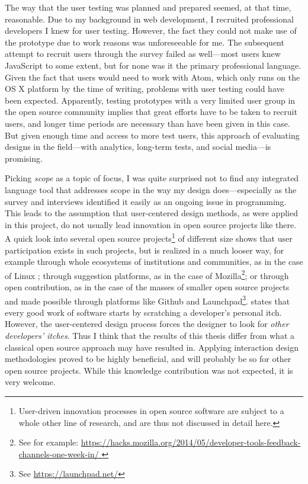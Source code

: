 The way that the user testing was planned and prepared seemed, at that
time, reasonable. Due to my background in web development, I recruited
professional developers I knew for user testing. However, the fact they
could not make use of the prototype due to work reasons was
unforeseeable for me. The subsequent attempt to recruit users through
the survey failed as well—most users knew JavaScript to some extent, but
for none was it the primary professional language. Given the fact that
users would need to work with Atom, which only runs on the OS X platform
by the time of writing, problems with user testing could have been
expected. Apparently, testing prototypes with a very limited user group
in the open source community implies that great efforts have to be taken
to recruit users, and longer time periods are necessary than have been
given in this case. But given enough time and access to more test users,
this approach of evaluating designs in the field—with analytics,
long-term tests, and social media—is promising.

Picking \emph{scope} as a topic of focus, I was quite surprised not to
find any integrated language tool that addresses scope in the way my
design does—especially as the survey and interviews identified it easily
as an ongoing issue in programming. This leads to the assumption that
user-centered design methods, as were applied in this project, do not
usually lead innovation in open source projects like there. A quick look
into several open source
projects\footnote{User-driven innovation processes in open source software are subject to a whole other line of research, and are thus not discussed in detail here.}
of different size shows that user participation exists in such projects,
but is realized in a much looser way, for example through whole
ecosystems of institutions and communities, as in the case of Linux
\cite{raymond2}; through suggestion platforms, as in the case of
Mozilla\footnote{See for example: \url{https://hacks.mozilla.org/2014/05/developer-tools-feedback-channels-one-week-in/
}}; or through open contribution, as in the case of the masses of
smaller open source projects and made possible through platforms like
Github and Launchpad\footnote{See \url{https://launchpad.net/}}.
 states that every good work of software starts by
scratching a developer's personal itch. However, the user-centered
design process forces the designer to look for \emph{other developers’
itches}. Thus I think that the results of this thesis differ from what a
classical open source approach may have resulted in. Applying
interaction design methodologies proved to be highly beneficial, and
will probably be so for other open source projects. While this knowledge
contribution was not expected, it is very welcome.

